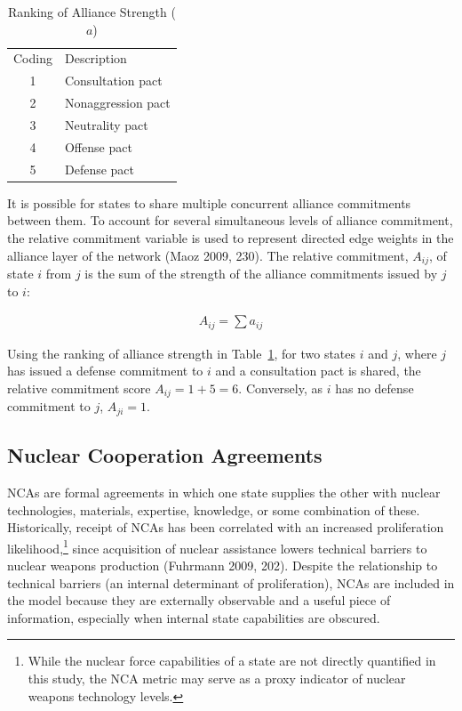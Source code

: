 \documentclass{article} %
\begin{document}
{\begin{table}
\centering
\caption{Ranking of Alliance Strength ($a$)
\label{tab:alliance}}
\begin{tabular}{c@{\hskip 0.35in}l}
\hline\noalign{\smallskip}
Coding & Description\\
\noalign{\smallskip}
\hline
\noalign{\smallskip}
1 & Consultation pact \\
2 & Nonaggression pact \\
3 & Neutrality pact \\
4 & Offense pact \\
5 & Defense pact \\
\hline
\end{tabular} 
\end{table}

It is possible for states to share multiple concurrent alliance commitments between them. To account for several simultaneous levels of alliance commitment, the relative commitment variable is used to represent directed edge weights in the alliance layer of the network (Maoz 2009, 230). The relative commitment, $A_{ij}$, of state $i$ from $j$ is the sum of the strength of the alliance commitments issued by $j$ to $i$: 
\begin{center}
\begin{equation}
\begin{aligned}
A_{ij} = \sum a_{ij}
\end{aligned}
\end{equation}
\end{center}
Using the ranking of alliance strength in Table~\ref{tab:alliance}, for two states $i$ and $j$, where $j$ has issued a defense commitment to $i$ and a consultation pact is shared, the relative commitment score $A_{ij} =1+5 = 6$. Conversely, as $i$ has no defense commitment to $j$, $A_{ji} =1$. 


\subsection{Nuclear Cooperation Agreements}

NCAs are formal agreements in which one state supplies the other with nuclear technologies, materials, expertise, knowledge, or some combination of these. Historically, receipt of NCAs has been correlated with an increased proliferation likelihood,\footnote{While the nuclear force capabilities of a state are not directly quantified in this study, the NCA metric may serve as a proxy indicator of nuclear weapons technology levels.} since acquisition of nuclear assistance lowers technical barriers to nuclear weapons production (Fuhrmann 2009, 202). Despite the relationship to technical barriers (an internal determinant of proliferation), NCAs are included in the model because they are externally observable and a useful piece of information, especially when internal state capabilities are obscured.

}
\end{document}
